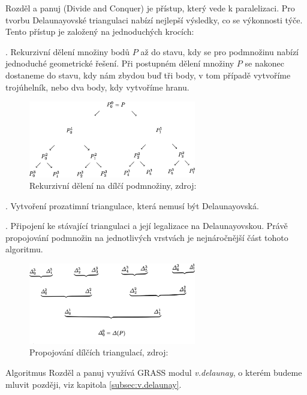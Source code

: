 \documentclass[12pt,a4paper]{article}
\begin{document}
Rozděl a panuj (Divide and Conquer) je přístup, který vede k paralelizaci. Pro tvorbu
Delaunayovské triangulaci nabízí nejlepší výsledky, co se výkonnosti
týče. Tento přístup je založený na jednoduchých krocích:

. Rekurzivní dělení množiny bodů $P$ až do stavu, kdy se
pro podmnožinu nabízí jednoduché geometrické řešení. Při postupném
dělení množiny $P$ se nakonec dostaneme do stavu, kdy nám zbydou buď
tři body, v tom případě vytvoříme trojúhelník, nebo dva body, kdy
vytvoříme hranu.
\begin{figure}[h!]
\centering
\includegraphics[width=0.65\textwidth]{img/div_n_conq.png}
\caption{Rekurzivní dělení na dílčí podmnožiny, zdroj: \cite{triangulation}}
\label{fig:div_n_conq}
\end{figure}

. Vytvoření prozatimní triangulace, která nemusí být
Delaunayovská.

. Připojení ke stávající triangulaci a její legalizace na
Delaunayovskou. Právě propojování podmnožin na jednotlivých vrstvách
je nejnáročnější část tohoto algoritmu.

\bigskip

\begin{figure}[h!]
\centering
\includegraphics[width=0.65\textwidth]{img/merge.png}
\caption{Propojování dílčích triangulací, zdroj: \cite{triangulation}}
\label{fig:merge}
\end{figure}

Algoritmus Rozděl a panuj využívá GRASS modul \emph{v.delaunay}, o
kterém budeme mluvit později, viz kapitola \ref{subsec:v.delaunay}.
\end{document}
